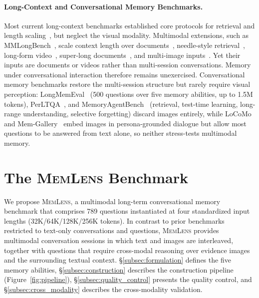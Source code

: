 \documentclass{article}
\newcommand{\bench}{\textsc{MemLens}}
\begin{document}
\paragraph{Long-Context and Conversational Memory Benchmarks.}
Most current long-context benchmarks established core protocols for retrieval and length scaling~\cite{bai2024longbench,bai2024longbenchv2,hsiehruler,yen2024helmet,an2024eval,zhang2024bench,li2024needlebench}, but neglect the visual modality. Multimodal extensions, such as MMLongBench~\citep{mmlongbench}, scale context length over documents~\cite{mmlongbench,ma2024mmlongbenchdocbenchmarkinglongcontextdocument}, needle-style retrieval~\cite{wang2024needlemultimodalhaystack,wang2025multimodalneedlehaystackbenchmarking}, long-form video~\cite{zhou2025mlvubenchmarkingmultitasklong,wu2024longvideobenchbenchmarklongcontextinterleaved}, super-long documents~\cite{deng2024longdocurl,chiam}, and multi-image inputs~\cite{wang2024divscene,song2024milebench,wang2024longllava,ye2024mplug}. Yet their inputs are documents or videos rather than multi-session conversations. Memory under conversational interaction therefore remains unexercised. Conversational memory benchmarks restore the multi-session structure but rarely require visual perception: LongMemEval~\cite{wu2025longmemevalbenchmarkingchatassistants} (500 questions over five memory abilities, up to 1.5M tokens), PerLTQA~\cite{du2024perltqapersonallongtermmemory}, and MemoryAgentBench~\cite{memoryagentbench} (retrieval, test-time learning, long-range understanding, selective forgetting) discard images entirely, while LoCoMo~\cite{maharana2024evaluatinglongtermconversationalmemory} and Mem-Gallery~\cite{memgallery} embed images in persona-grounded dialogue but allow most questions to be answered from text alone, so neither stress-tests multimodal memory.


\section{The \bench{} Benchmark}
\label{sec:benchmark}
We propose \bench{}, a multimodal long-term conversational memory benchmark that comprises 789 questions instantiated at four standardized input lengths (32K/64K/128K/256K tokens). In contrast to prior benchmarks restricted to text-only conversations and questions, \bench{} provides multimodal conversation sessions in which text and images are interleaved, together with questions that require cross-modal reasoning over evidence images and the surrounding textual context.
\S\ref{subsec:formulation} defines the five memory abilities, \S\ref{subsec:construction} describes the construction pipeline (Figure~\ref{fig:pipeline}), \S\ref{subsec:quality_control} presents the quality control, and  \S\ref{subsec:cross_modality} describes the cross-modality validation.
\end{document}

